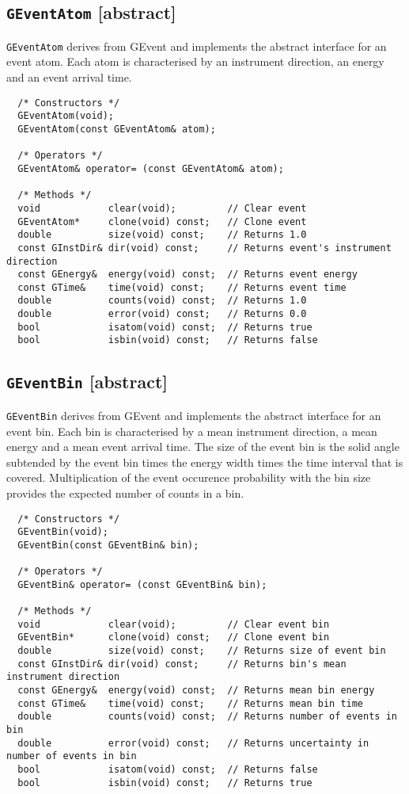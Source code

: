 \documentclass{article}[12pt,a4]
\begin{document}
\subsection{{\tt GEventAtom} \small[abstract]}
\label{GEventAtom}
{\tt GEventAtom} derives from {GEvent} and implements the abstract interface for an event
atom. 
Each atom is characterised by an instrument direction, an energy and an event arrival time. 
\begin{verbatim}
  /* Constructors */
  GEventAtom(void);
  GEventAtom(const GEventAtom& atom);

  /* Operators */
  GEventAtom& operator= (const GEventAtom& atom);

  /* Methods */
  void            clear(void);         // Clear event
  GEventAtom*     clone(void) const;   // Clone event
  double          size(void) const;    // Returns 1.0
  const GInstDir& dir(void) const;     // Returns event's instrument direction
  const GEnergy&  energy(void) const;  // Returns event energy
  const GTime&    time(void) const;    // Returns event time
  double          counts(void) const;  // Returns 1.0
  double          error(void) const;   // Returns 0.0
  bool            isatom(void) const;  // Returns true
  bool            isbin(void) const;   // Returns false
\end{verbatim}


\subsection{{\tt GEventBin} \small[abstract]}
\label{GEventBin}
{\tt GEventBin} derives from {GEvent} and implements the abstract interface for an event
bin.
Each bin is characterised by a mean instrument direction, a mean energy and a
mean event arrival time.
The size of the event bin is the solid angle subtended by the event bin times the energy 
width times the time interval that is covered.
Multiplication of the event occurence probability with the bin size provides the expected
number of counts in a bin.
\begin{verbatim}
  /* Constructors */
  GEventBin(void);
  GEventBin(const GEventBin& bin);

  /* Operators */
  GEventBin& operator= (const GEventBin& bin);

  /* Methods */
  void            clear(void);         // Clear event bin
  GEventBin*      clone(void) const;   // Clone event bin
  double          size(void) const;    // Returns size of event bin
  const GInstDir& dir(void) const;     // Returns bin's mean instrument direction
  const GEnergy&  energy(void) const;  // Returns mean bin energy
  const GTime&    time(void) const;    // Returns mean bin time
  double          counts(void) const;  // Returns number of events in bin
  double          error(void) const;   // Returns uncertainty in number of events in bin
  bool            isatom(void) const;  // Returns false
  bool            isbin(void) const;   // Returns true
\end{verbatim}
\end{document}

